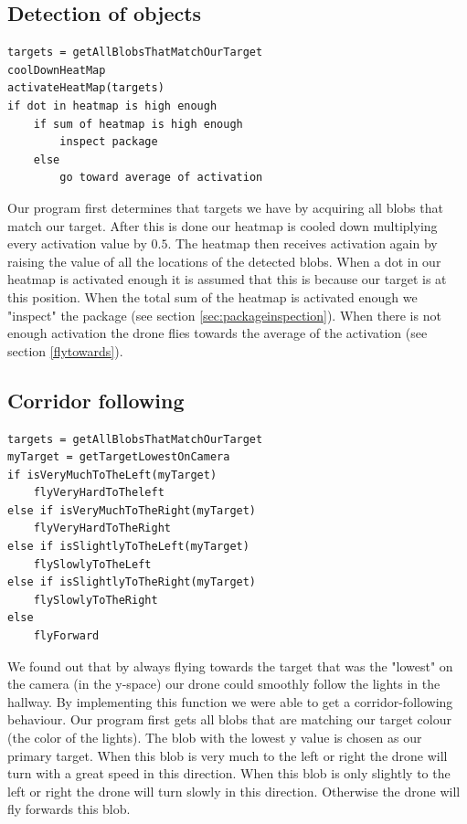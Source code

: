 \documentclass[a4paper,10pt]{article}
\begin{document}
\subsection{Detection of objects}
\begin{verbatim}
targets = getAllBlobsThatMatchOurTarget
coolDownHeatMap
activateHeatMap(targets)
if dot in heatmap is high enough
    if sum of heatmap is high enough
        inspect package
    else
        go toward average of activation
\end{verbatim}
Our program first determines that targets we have by acquiring all blobs that match our target.
After this is done our heatmap is cooled down multiplying every activation value by $0.5$. 
The heatmap then receives activation again by raising the value of all the locations of the detected blobs. 
When a dot in our heatmap is activated enough it is assumed that this is because our target is at this position. 
When the total sum of the heatmap is activated enough we "inspect" the package (see section \ref{sec:packageinspection}). 
When there is not enough activation the drone flies towards the average of the activation (see section \ref{flytowards}).



\subsection{Corridor following} 
\label{sec:corridorfollowing}
\begin{verbatim}
targets = getAllBlobsThatMatchOurTarget
myTarget = getTargetLowestOnCamera
if isVeryMuchToTheLeft(myTarget)
    flyVeryHardToTheleft
else if isVeryMuchToTheRight(myTarget)
    flyVeryHardToTheRight
else if isSlightlyToTheLeft(myTarget)
    flySlowlyToTheLeft
else if isSlightlyToTheRight(myTarget)
    flySlowlyToTheRight
else
    flyForward
\end{verbatim}

We found out that by always flying towards the target that was the "lowest" on the camera (in the y-space) our drone could smoothly follow the lights in the hallway. 
By implementing this function we were able to get a corridor-following behaviour. 
Our program first gets all blobs that are matching our target colour (the color of the lights). 
The blob with the lowest y value is chosen as our primary target. 
When this blob is very much to the left or right the drone will turn with a great speed in this direction. 
When this blob is only slightly to the left or right the drone will turn slowly in this direction. 
Otherwise the drone will fly forwards this blob. 
\end{document}
